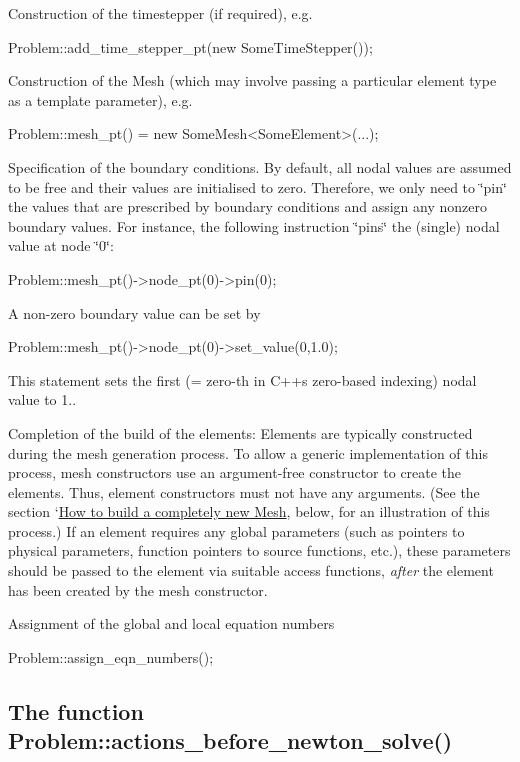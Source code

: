 \begin{DoxyItemize}
\item Construction of the timestepper (if required), e.\+g. 
\begin{DoxyCode}
Problem::add\_time\_stepper\_pt(\textcolor{keyword}{new} SomeTimeStepper()); 
\end{DoxyCode}

\item Construction of the {\ttfamily Mesh} (which may involve passing a particular element type as a template parameter), e.\+g. 
\begin{DoxyCode}
Problem::mesh\_pt() = \textcolor{keyword}{new} SomeMesh<SomeElement>(...); 
\end{DoxyCode}

\item Specification of the boundary conditions. By default, all nodal values are assumed to be free and their values are initialised to zero. Therefore, we only need to \char`\"{}pin\char`\"{} the values that are prescribed by boundary conditions and assign any nonzero boundary values. For instance, the following instruction \char`\"{}pins\char`\"{} the (single) nodal value at node \char`\"{}0\char`\"{}\+: 
\begin{DoxyCode}
Problem::mesh\_pt()->node\_pt(0)->pin(0); 
\end{DoxyCode}
 A non-\/zero boundary value can be set by 
\begin{DoxyCode}
Problem::mesh\_pt()->node\_pt(0)->set\_value(0,1.0); 
\end{DoxyCode}
 This statement sets the first (= zero-\/th in C++\textquotesingle{}s zero-\/based indexing) nodal value to 1..
\item Completion of the build of the elements\+: Elements are typically constructed during the mesh generation process. To allow a generic implementation of this process, mesh constructors use an argument-\/free constructor to create the elements. Thus, element constructors must not have any arguments. (See the section `\hyperlink{index_new_mesh}{How to build a completely new Mesh}\textquotesingle{}, below, for an illustration of this process.) If an element requires any global parameters (such as pointers to physical parameters, function pointers to source functions, etc.), these parameters should be passed to the element via suitable access functions, {\itshape after} the element has been created by the mesh constructor.
\item Assignment of the global and local equation numbers 
\begin{DoxyCode}
Problem::assign\_eqn\_numbers(); 
\end{DoxyCode}

\end{DoxyItemize}\hypertarget{index_actbef}{}\subsection{The function Problem\+::actions\+\_\+before\+\_\+newton\+\_\+solve()}\label{index_actbef}
